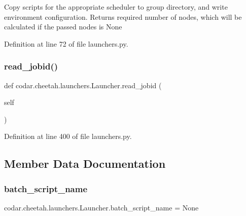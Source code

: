 \begin{DoxyVerb}Copy scripts for the appropriate scheduler to group directory,
and write environment configuration. Returns required number of nodes,
which will be calculated if the passed nodes is None\end{DoxyVerb}
 

Definition at line 72 of file launchers.\+py.

\mbox{\label{classcodar_1_1cheetah_1_1launchers_1_1_launcher_af6f838444c55859d67a1ad60fed1198e}} 
\subsubsection{\texorpdfstring{read\+\_\+jobid()}{read\_jobid()}}
{\footnotesize\ttfamily def codar.\+cheetah.\+launchers.\+Launcher.\+read\+\_\+jobid (\begin{DoxyParamCaption}\item[{}]{self }\end{DoxyParamCaption})}



Definition at line 400 of file launchers.\+py.



\subsection{Member Data Documentation}
\mbox{\label{classcodar_1_1cheetah_1_1launchers_1_1_launcher_af55f3a888f545826d771f3679152da47}} 
\subsubsection{\texorpdfstring{batch\+\_\+script\+\_\+name}{batch\_script\_name}}
{\footnotesize\ttfamily codar.\+cheetah.\+launchers.\+Launcher.\+batch\+\_\+script\+\_\+name = None\hspace{0.3cm}{\ttfamily [static]}}



